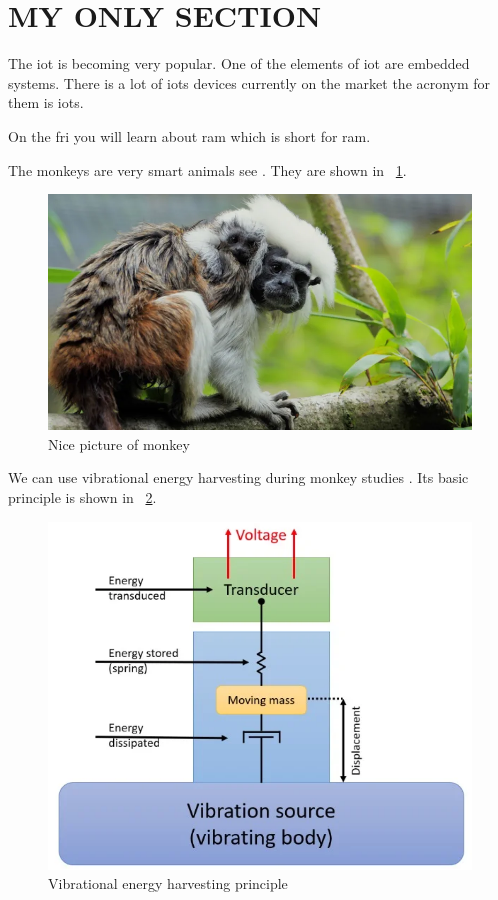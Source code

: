 \section{MY ONLY SECTION}

The \ac{iot} is becoming very popular. One of the elements of \ac{iot} are embedded systems. There is a lot of \aclp{iot} devices currently on the market the acronym for them is \acsp{iot}.

On the \acf{fri} you will learn about \acs{ram} which is short for \acl{ram}.

The monkeys are very smart animals see \cite{article_first}. They are shown in \figurename ~\ref{fig:monkey}. 

\begin{figure}[ht]
	\centering
	\includegraphics[width=1.0\linewidth]{pictures/monkey}
	\caption{Nice picture of monkey \cite{figure_first}}
	\label{fig:monkey}
\end{figure}


We can use vibrational energy harvesting during monkey studies \cite{article_second}. Its basic principle is shown in \figurename  ~\ref{fig:vibrationalenergyharvesting}.

\begin{figure}[ht]
	\centering
	\includegraphics[width=1.0\linewidth]{pictures/vibrational_energy_harvesting}
	\caption{Vibrational energy harvesting principle \cite{figure_second}}
	\label{fig:vibrationalenergyharvesting}
\end{figure}

